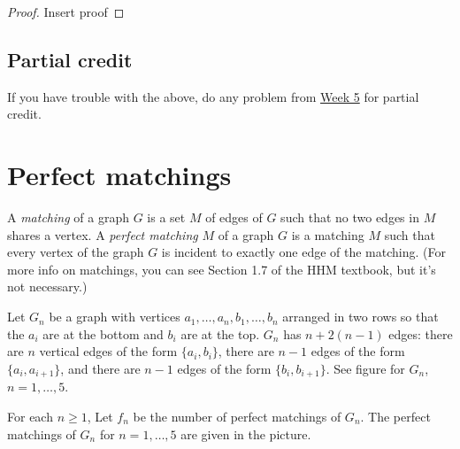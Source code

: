 \documentclass[10pt, oneside]{amsart}
\begin{document}
\begin{proof}
	Insert proof
\end{proof}

\subsection*{Partial credit}
If you have trouble with the above, do any problem from 
\href{https://egunawan.github.io/combinatorics/hw/wk5problems.pdf}
{Week 5} for partial credit.












\section{Perfect matchings}

A \emph{matching} of a graph $G$ is a set $M$ of edges of $G$ such that no two edges in $M$ shares a vertex.
A \emph{perfect matching} $M$ of a graph $G$ is a matching $M$ such that 
every vertex of the graph  $G$ is incident to exactly one edge of the matching. (For more info on matchings, you can see Section 1.7 of the HHM textbook, but it's not necessary.)

Let $G_n$ be a graph with vertices $a_1,\dots, a_n, b_1,\dots, b_n$ arranged in two rows so that the $a_i$ are at the bottom and $b_i$ are at the top. 
$G_n$ has $n + 2(n-1)$ edges:
there are $n$ vertical edges of the form $\{a_i,b_i\}$, there are $n-1$ edges of the form $\{a_i,a_{i+1}\}$, and there are $n-1$ edges of the form $\{b_i,b_{i+1}\}$.
See figure for $G_n$, $n=1,\dots, 5$.

For each $n\geq 1$, Let $f_n$ be the number of perfect matchings of $G_n$.
 The perfect matchings of $G_n$ for $n=1,\dots, 5$ are given in the picture.
\end{document}
